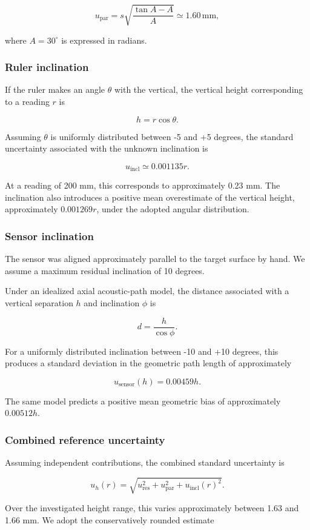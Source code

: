 \documentclass[11pt,a4paper]{article}
\begin{document}
\[
u_{\mathrm{par}} =
s\sqrt{\frac{\tan A-A}{A}}
\simeq 1.60\,\mathrm{mm},
\]

where \(A=30^\circ\) is expressed in radians.
\subsubsection{Ruler inclination}
\label{sec:orgf6e39d2}
If the ruler makes an angle \(\theta\) with the vertical, the vertical height corresponding to a reading \(r\) is

\[
h=r\cos\theta.
\]

Assuming \(\theta\) is uniformly distributed between -5 and +5 degrees, the standard uncertainty associated with the unknown inclination is

\[
u_{\mathrm{incl}} \simeq 0.001135r.
\]

At a reading of 200 mm, this corresponds to approximately 0.23 mm. The inclination also introduces a positive mean overestimate of the vertical height, approximately \(0.001269r\), under the adopted angular distribution.
\subsubsection{Sensor inclination}
\label{sec:org7239d74}
The sensor was aligned approximately parallel to the target surface by hand. We assume a maximum residual inclination of 10 degrees.

Under an idealized axial acoustic-path model, the distance associated with a vertical separation \(h\) and inclination \(\phi\) is

\[
d=\frac{h}{\cos\phi}.
\]

For a uniformly distributed inclination between -10 and +10 degrees, this produces a standard deviation in the geometric path length of approximately

\[
u_{\mathrm{sensor}}(h)=0.00459h.
\]

The same model predicts a positive mean geometric bias of approximately \(0.00512h\).
\subsubsection{Combined reference uncertainty}
\label{sec:org91a1538}
Assuming independent contributions, the combined standard uncertainty is

\[
u_h(r)=\sqrt{
u_{\mathrm{res}}^2+
u_{\mathrm{par}}^2+
u_{\mathrm{incl}}(r)^2
}.
\]

Over the investigated height range, this varies approximately between 1.63 and 1.66 mm. We adopt the conservatively rounded estimate
\end{document}
